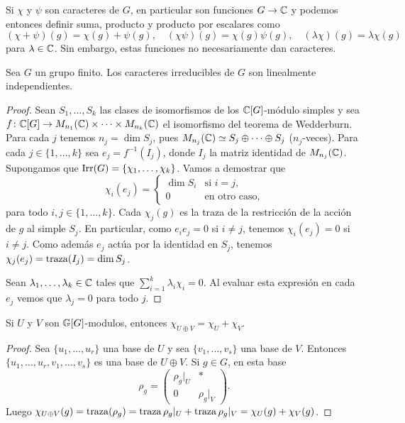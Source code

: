 Si $\chi$ y $\psi$ son caracteres de $G$, en particular son funciones $G\to\mathbb{C}$ y podemos entonces
definir suma, producto y producto por escalares como
\[
(\chi+\psi)(g)=\chi(g)+\psi(g),\quad
(\chi\psi)(g)=\chi(g)\psi(g),\quad
(\lambda\chi)(g)=\lambda\chi(g)
\]
para $\lambda\in\mathbb{C}$. Sin embargo, estas funciones no necesariamente dan caracteres. 

\begin{theorem}
Sea $G$ un grupo finito. Los caracteres irreducibles de $G$ son linealmente independientes.
\end{theorem}

\begin{proof}
Sean $S_1,\dots,S_k$ las clases de isomorfismos de los $\mathbb{C}[G]$-módulo simples y
sea $f\colon \mathbb{C}[G]\to M_{n_1}(\mathbb{C})\times\cdots\times M_{n_k}(\mathbb{C})$ el isomorfismo del teorema de Wedderburn. 
Para cada $j$ tenemos $n_j=\dim S_j$, pues $M_{n_j}(\mathbb{C})\simeq S_j\oplus\cdots\oplus S_j$ ($n_j$-veces). 
Para cada $j\in\{1,\dots,k\}$ sea 
$e_j=f^{-1}(I_j)$, donde $I_j$ la matriz identidad de $M_{n_j}(\mathbb{C})$. 
Supongamos que $\operatorname{Irr}(G)=\{\chi_1,\dots,\chi_k\}$. Vamos a demostrar que
\[
\chi_i(e_j)=\begin{cases}
\dim S_i & \text{si $i=j$},\\
0 & \text{en otro caso,}
\end{cases}
\]
para todo $i,j\in\{1,\dots,k\}$.
Cada $\chi_j(g)$ es la traza de la restricción de la acción de $g$ al simple $S_j$. En particular, 
como $e_ie_j=0$ si $i\ne j$, tenemos 
$\chi_i(e_j)=0$ si $i\ne j$. 
Como además $e_j$ actúa por la identidad en $S_j$, tenemos $\chi_j(e_j)=\operatorname{traza}(I_j)=\dim S_j$. 

Sean $\lambda_1,\dots,\lambda_k\in\mathbb{C}$ tales que $\sum_{i=1}^k\lambda_i\chi_i=0$. Al evaluar esta
expresión en cada $e_j$ vemos que $\lambda_j=0$ para todo $j$. 
\end{proof}

\begin{proposition}
    Si $U$ y $V$ son $\mathbb{G}[G]$-modulos, entonces $\chi_{U\oplus V}=\chi_U+\chi_V$.
\end{proposition}

\begin{proof}
    Sea $\{u_1,\dots,u_r\}$ una base de $U$ y sea $\{v_1,\dots,v_s\}$ una base de $V$. Entonces 
    $\{u_1,\dots,u_r,v_1,\dots,v_s\}$ es una base de $U\oplus V$. Si $g\in G$, en esta
    base 
    \[
    \rho_g=\begin{pmatrix}
      \rho_g|_U & *\\
      0 & \rho_g|_V
    \end{pmatrix}.
    \]
    Luego $\chi_{U\oplus V}(g)=\operatorname{traza}(\rho_g)=\operatorname{traza}\rho_g|_U+\operatorname{traza}\rho_g|_V=\chi_U(g)+\chi_V(g)$.
\end{proof}

